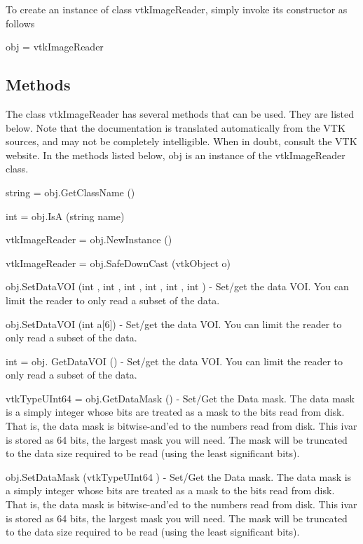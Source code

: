 To create an instance of class vtk\-Image\-Reader, simply invoke its constructor as follows \begin{DoxyVerb}  obj = vtkImageReader
\end{DoxyVerb}
 \hypertarget{vtkwidgets_vtkxyplotwidget_Methods}{}\subsection{Methods}\label{vtkwidgets_vtkxyplotwidget_Methods}
The class vtk\-Image\-Reader has several methods that can be used. They are listed below. Note that the documentation is translated automatically from the V\-T\-K sources, and may not be completely intelligible. When in doubt, consult the V\-T\-K website. In the methods listed below, {\ttfamily obj} is an instance of the vtk\-Image\-Reader class. 
\begin{DoxyItemize}
\item {\ttfamily string = obj.\-Get\-Class\-Name ()}  
\item {\ttfamily int = obj.\-Is\-A (string name)}  
\item {\ttfamily vtk\-Image\-Reader = obj.\-New\-Instance ()}  
\item {\ttfamily vtk\-Image\-Reader = obj.\-Safe\-Down\-Cast (vtk\-Object o)}  
\item {\ttfamily obj.\-Set\-Data\-V\-O\-I (int , int , int , int , int , int )} -\/ Set/get the data V\-O\-I. You can limit the reader to only read a subset of the data.  
\item {\ttfamily obj.\-Set\-Data\-V\-O\-I (int a\mbox{[}6\mbox{]})} -\/ Set/get the data V\-O\-I. You can limit the reader to only read a subset of the data.  
\item {\ttfamily int = obj. Get\-Data\-V\-O\-I ()} -\/ Set/get the data V\-O\-I. You can limit the reader to only read a subset of the data.  
\item {\ttfamily vtk\-Type\-U\-Int64 = obj.\-Get\-Data\-Mask ()} -\/ Set/\-Get the Data mask. The data mask is a simply integer whose bits are treated as a mask to the bits read from disk. That is, the data mask is bitwise-\/and'ed to the numbers read from disk. This ivar is stored as 64 bits, the largest mask you will need. The mask will be truncated to the data size required to be read (using the least significant bits).  
\item {\ttfamily obj.\-Set\-Data\-Mask (vtk\-Type\-U\-Int64 )} -\/ Set/\-Get the Data mask. The data mask is a simply integer whose bits are treated as a mask to the bits read from disk. That is, the data mask is bitwise-\/and'ed to the numbers read from disk. This ivar is stored as 64 bits, the largest mask you will need. The mask will be truncated to the data size required to be read (using the least significant bits).  

\end{DoxyItemize}
